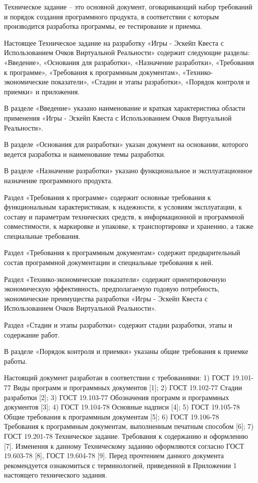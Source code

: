 
\tab[0.75cm] Техническое задание – это основной документ, оговаривающий набор требований и
порядок создания программного продукта, в соответствии с которым производится разработка
программы, ее тестирование и приемка.

Настоящее Техническое задание на разработку «Игры - Эскейп Квеста с Использованием Очков Виртуальной Реальности» содержит следующие разделы: «Введение», «Основания для разработки»,
«Назначение разработки», «Требования к программе», «Требования к программным документам»,
«Технико-экономические показатели», «Стадии и этапы разработки», «Порядок контроля и
приемки» и приложения.

В разделе «Введение» указано наименование и краткая характеристика области применения
«Игры - Эскейп Квеста с Использованием Очков Виртуальной Реальности».

В разделе «Основания для разработки» указан документ на основании, которого ведется
разработка и наименование темы разработки.

В разделе «Назначение разработки» указано функциональное и эксплуатационное
назначение программного продукта.

Раздел «Требования к программе» содержит основные требования к функциональным
характеристикам, к надежности, к условиям эксплуатации, к составу и параметрам технических
средств, к информационной и программной совместимости, к маркировке и упаковке, к
транспортировке и хранению, а также специальные требования.

Раздел «Требования к программным документам» содержит предварительный состав
программной документации и специальные требования к ней.

Раздел «Технико-экономические показатели» содержит ориентировочную экономическую
эффективность, предполагаемую годовую потребность, экономические преимущества разработки
«Игры - Эскейп Квеста с Использованием Очков Виртуальной Реальности».

Раздел «Стадии и этапы разработки» содержит стадии разработки, этапы и содержание
работ.

В разделе «Порядок контроля и приемки» указаны общие требования к приемке работы.

Настоящий документ разработан в соответствии с требованиями:
1) ГОСТ 19.101-77 Виды программ и программных документов [1];
2) ГОСТ 19.102-77 Стадии разработки [2];
3) ГОСТ 19.103-77 Обозначения программ и программных документов [3];
4) ГОСТ 19.104-78 Основные надписи [4];
5) ГОСТ 19.105-78 Общие требования к программным документам [5];
6) ГОСТ 19.106-78 Требования к программным документам, выполненным печатным способом
[6];
7) ГОСТ 19.201-78 Техническое задание. Требования к содержанию и оформлению [7].
Изменения к данному Техническому заданию оформляются согласно ГОСТ 19.603-78 [8],
ГОСТ 19.604-78 [9].
Перед прочтением данного документа рекомендуется ознакомиться с терминологией,
приведенной в Приложении 1 настоящего технического задания.